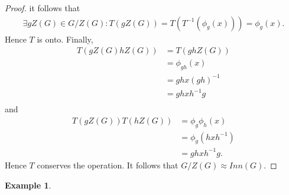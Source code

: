 \documentclass{article}
\newtheorem{theorem}{Theorem}[section]
\theoremstyle{definition}
\newtheorem{example}{Example}[section]
\begin{document}
\begin{proof}
        it follows that
        \begin{align*}
            \exists gZ(G) \in G/Z(G): T(gZ(G)) = T(T^{-1}(\phi_g(x))) = \phi_g(x).
        \end{align*}
        Hence $T$ is onto. Finally,
        \begin{align*}
            T(gZ(G)hZ(G)) &= T(ghZ(G)) \\
            &= \phi_{gh}(x) \\
            &= ghx(gh)^{-1} \\
            &= ghxh^{-1}g \\
        \end{align*}
        and
        \begin{align*}
            T(gZ(G))T(hZ(G)) &= \phi_g\phi_h(x) \\
            &= \phi_g(hxh^{-1}) \\
            &= ghxh^{-1}g.
        \end{align*}
        Hence $T$ conserves the operation. It follows that $G/Z(G) \approx Inn(G)$.
        \end{proof}
        
        \begin{example}
        \end{example}
        
        \noindent{}
        
\end{document}
